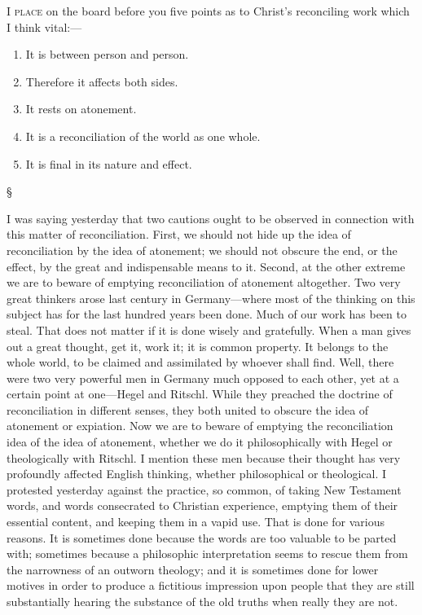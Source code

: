 \documentclass[12pt,a5paper,twoside,titlepage]{book}
\begin{document}









\textsc{I place} on the board before you five points 
as to Christ's reconciling work which I 
think vital:--- 

\begin{enumerate}
\item It is between person and person.
\item Therefore it affects both sides. 
\item It rests on atonement. 
\item It is a reconciliation of the world as 
one whole. 
\item It is final in its nature and effect.
\end{enumerate}

\begin{center}
\S
\end{center}

I was saying yesterday that two cautions 
ought to be observed in connection with this 
matter of reconciliation. First, we should not 
hide up the idea of reconciliation by the idea of 
atonement; we should not obscure the end, or 
the effect, by the great and indispensable means 
to it. Second, at the other extreme we are to 
beware of emptying reconciliation of atonement 
altogether. Two very great thinkers arose last 
century in Germany---where most of the thinking 
on this subject has for the last hundred years 
been done. Much of our work has been to steal. 
That does not matter if it is done wisely and 
gratefully. When a man gives out a great 
thought, get it, work it; it is common property. 
It belongs to the whole world, to be claimed and 
assimilated by whoever shall find. Well, there 
were two very powerful men in Germany much 
opposed to each other, yet at a certain point at 
one---Hegel and Ritschl. While they preached 
the doctrine of reconciliation in different senses, 
they both united to obscure the idea of atonement 
or expiation. Now we are to beware of 
emptying the reconciliation idea of the idea 
of atonement, whether we do it philosophically 
with Hegel or theologically with Ritschl. I 
mention these men because their thought has 
very profoundly affected English thinking, 
whether philosophical or theological. I protested 
yesterday against the practice, so common, 
of taking New Testament words, and 
words consecrated to Christian experience, 
emptying them of their essential content, and 
keeping them in a vapid use. That is done for 
various reasons. It is sometimes done because 
the words are too valuable to be parted with; 
sometimes because a philosophic interpretation 
seems to rescue them from the narrowness of 
an outworn theology; and it is sometimes done 
for lower motives in order to produce a fictitious 
impression upon people that they are still substantially 
hearing the substance of the old truths 
when really they are not. 
\end{document}
